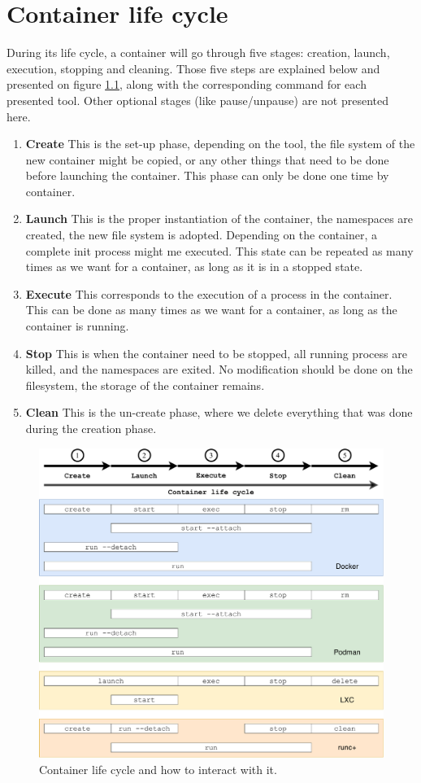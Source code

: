 \chapter{Container life cycle}
During its life cycle, a container will go through five stages: creation, launch, execution, stopping and cleaning.  Those five steps are explained below and presented on figure \ref{fig:container-life-cycle}, along with the corresponding command for each presented tool.  Other optional stages (like pause/unpause) are not presented here.
\begin{enumerate}
\item\textbf{Create} This is the set-up phase, depending on the tool, the file system of the new container might be copied, or any other things that need to be done before launching the container.  This phase can only be done one time by container.
\item\textbf{Launch} This is the proper instantiation of the container, the namespaces are created, the new file system is adopted.  Depending on the container, a complete init process might me executed.  This state can be repeated as many times as we want for a container, as long as it is in a stopped state.
\item\textbf{Execute} This corresponds to the execution of a process in the container.  This can be done as many times as we want for a container, as long as the container is running.
\item\textbf{Stop} This is when the container need to be stopped, all running process are killed, and the namespaces are exited.  No modification should be done on the filesystem, the storage of the container remains.
\item\textbf{Clean} This is the un-create phase, where we delete everything that was done during the creation phase.
\end{enumerate}
\begin{figure}[!h]
  \begin{center}
    \includegraphics[width=\linewidth]{images/Container-life-cycle.pdf}
    \caption{Container life cycle and how to interact with it.}
    \label{fig:container-life-cycle}
  \end{center}
\end{figure}
